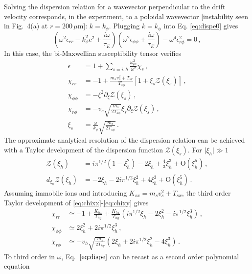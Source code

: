 \documentclass[aps,showpacs,superscriptaddress]{revtex4}
\begin{document}
Solving the dispersion relation for a wavevector perpendicular to the drift velocity corresponds, in the experiment, to a poloidal wavevector [instability seen in Fig.~4(a) at $r = 200\, \mu$m]: $k = k_\phi$. 
Plugging $k = k_\phi$ into Eq. \eqref{eq:dispe0} gives
\begin{equation}\label{eq:dispe}
\left(\omega^2 \epsilon_{rr} - k_\phi^2c^2 +\frac{i\omega}{\tau_E}\right)
\left(\omega^2 \epsilon_{\phi\phi} +\frac{i\omega}{\tau_E}\right)
-\omega^4 \epsilon_{r\phi}^2 = 0 \, ,
\end{equation}
In this case, the bi-Maxwellian susceptibility tensor verifies \cite[]{POP_Ruyer_2015}
\begin{align}
 \epsilon &=  1 + \sum_{s = i,h}\frac{\omega_{ps}^2}{\omega^2}  \chi_s\, , \label{eq:eps}\\
  \chi_{rr} &= -1  + \frac{m_sv_s^2 + T_{sr} }{T_{s\phi}} [1+\xi_s\mathcal{Z}(\xi_s) ]\, \label{eq:chixx},\\
  \chi_{\phi\phi} &=-\xi^2 \partial_\xi\mathcal{Z}(\xi_s) \, ,\\
  \chi_{r\phi} & =  -v_s\sqrt{\frac{m_s}{2T_{s\phi}}} \xi_s \partial_\xi \mathcal{Z}(\xi_s)  \label{eq:chixy}\, ,\\
  \xi_s  &= \frac{\omega }{k_\phi} \sqrt{\frac{m_s}{2T_{s\phi}}}\label{eq:xi} \, .
\end{align}
The approximate analytical resolution of the dispersion relation can be achieved with a Taylor development of the dispersion function $\mathcal{Z}(\xi_s)$. For $\vert \xi_h \vert\gg 1$
\begin{align}
\mathcal{Z}(\xi_h) & =  i\pi^{1/2}(1-\xi_h^2) -2\xi_h +\frac{4}{3}\xi_h^3 + \mathrm{O}(\xi_h^5) \label{eq:taylor1} \, ,\\
d_{\xi_h} \mathcal{Z}(\xi_h)  &= -2\xi_h -2i\pi^{1/2}\xi_h^2 +4\xi_h^3+ \mathrm{O}(\xi_h^5)\label{eq:taylor2} \, .
\end{align}
Assuming immobile ions and introducing  $K_{sx} = m_sv_s^2 + T_{sx}$, the third order Taylor development of \eqref{eq:chixx}-\eqref{eq:chixy} gives
\begin{align}
  \chi_{rr} &\simeq -1  + \frac{K_{hx} }{T_{hy}} + \frac{K_{hx} }{T_{hy}} ( i\pi^{1/2}\xi_h -2\xi_h^2 -i\pi^{1/2}\xi_h^3) \, ,\\
  \chi_{\phi\phi} &\simeq2\xi_h^2+ 2i\pi^{1/2}\xi_h^3 \, ,\\
  \chi_{r\phi} & \simeq  -v_h\sqrt{\frac{m_s}{2T_{hy}}} (2\xi_h + 2i\pi^{1/2}\xi_h^2 -4\xi_h^3) \, .
\end{align}
To third order in $\omega$, Eq.~$\eqref{eq:dispe}$ can be recast as a second order polynomial equation 
\end{document}
